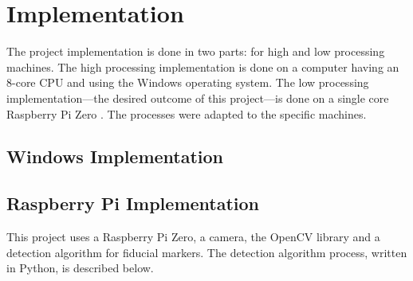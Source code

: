 \documentclass[12pt,a4paper]{report}
\begin{document}

\chapter{Implementation}
\label{Chapter: Implementation}
The project implementation is done in two parts: for high and low processing machines. The high processing implementation is done on a computer having an 8-core CPU and using the Windows operating system. The low processing implementation---the desired outcome of this project---is done on a single core Raspberry Pi Zero \cite{raspberrypizero}. The processes were adapted to the specific machines.

\section{Windows Implementation}

\section{Raspberry Pi Implementation}
This project uses a Raspberry Pi Zero, a camera, the OpenCV library and a detection algorithm for fiducial markers. The detection algorithm process, written in Python, is described below.
\end{document}
